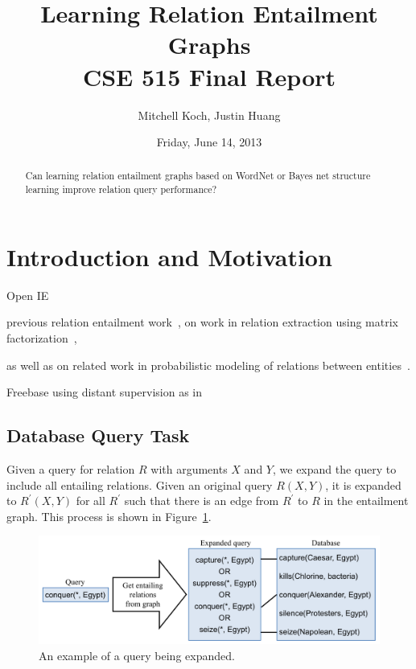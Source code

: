 \documentclass{article}
\author{Mitchell Koch, Justin Huang}
\title{Learning Relation Entailment Graphs\\CSE 515 Final Report}
\date{Friday, June 14, 2013}
\begin{document}
\maketitle

\begin{abstract}
Can learning relation entailment graphs based on WordNet or Bayes net
structure learning improve relation query performance?
\end{abstract}

\section{Introduction and Motivation}

Open IE~\cite{Etzioni:2008:OIE:1409360.1409378}

previous relation entailment
work~\cite{Berant:2012:LER:2122944.2122947, berant2011global}, on work in relation
extraction using matrix factorization~\cite{riedel13relation}, 

as well as on related work in probabilistic modeling of relations
between entities~\cite{TaskarWAK03, Taskar:2002:DPM:2073876.2073934}.

Freebase using distant supervision as in~\cite{HoffmannZLZW11}

\subsection{Database Query Task}

Given a query for relation $R$ with arguments $X$ and $Y$, we expand the query to include all entailing relations. Given an original query $R(X, Y)$, it is expanded to $R^\prime(X,Y)$ for all $R^\prime$ such that there is an edge from $R^\prime$ to $R$ in the entailment graph. This process is shown in Figure~\ref{query-expansion}. 

\begin{figure}[h]
\begin{center}
\includegraphics[width=1.0\textwidth]{figures/query-expansion.pdf}
\end{center}
\caption{An example of a query being expanded.}\label{query-expansion}
\end{figure}
\end{document}
